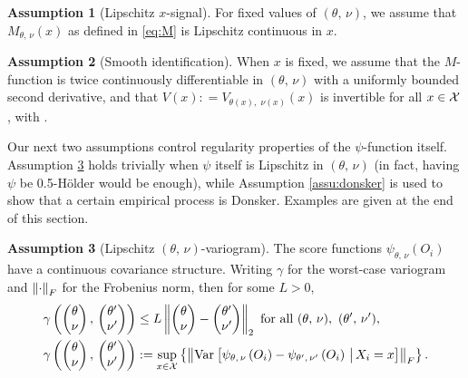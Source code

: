 \documentclass[aos]{imsart}
\theoremstyle{plain}
\theoremstyle{definition}
\newtheorem{assu}{Assumption}
\theoremstyle{remark}
\begin{document}
\begin{CJK}{UTF8}{gbsn}
{\begin{assu}[Lipschitz $x$-signal]
\label{assu:lip}
For fixed values of $(\theta, \, \nu)$, we assume that $M_{\theta, \, \nu}(x)$ 
as defined in \eqref{eq:M} is Lipschitz continuous in $x$.
\end{assu}

\begin{assu}[Smooth identification]
\label{assu:identification}
When $x$ is fixed, we assume that the $M$-function is twice continuously differentiable
in $(\theta, \, \nu)$ with a uniformly bounded second derivative, and
that $V(x): = V_{\theta(x), \, \, \nu(x)}(x)$ is invertible for all $x \in \mathcal{X}$, with
.
\end{assu}

Our next two assumptions control regularity properties of the $\psi$-function itself.
Assumption \ref{assu:covariance} holds trivially when $\psi$ itself is
Lipschitz in $(\theta, \, \nu)$ (in fact, having $\psi$ be 0.5-H{\"o}lder would be enough),
while Assumption \ref{assu:donsker} is used to show that a certain empirical process is
Donsker. Examples are given at the end of this section.

\begin{assu}[Lipschitz $(\theta, \, \nu)$-variogram]
\label{assu:covariance}
The score functions $\psi_{\theta, \, \nu}(O_i)$ 
have a continuous covariance structure.
Writing $\gamma$ for the worst-case variogram
and $\left\lVert\cdot\right\rVert_F$ for the Frobenius norm,
then for some $L > 0$,
\begin{equation}
\label{eq:variogram}
\begin{split}
&\gamma\p{ \begin{pmatrix} \theta \\ \nu \end{pmatrix}, \,  \begin{pmatrix} \theta' \\ \nu' \end{pmatrix}} \leq
L \Norm{\begin{pmatrix} \theta \\ \nu \end{pmatrix} -   \begin{pmatrix} \theta' \\ \nu' \end{pmatrix}}_2
\text{ for all } (\theta,\, \nu), \ (\theta',\,\nu'), \\
&\gamma\p{ \begin{pmatrix} \theta \\ \nu \end{pmatrix}, \,  \begin{pmatrix} \theta' \\ \nu' \end{pmatrix}}
:= \sup_{x \in \xx} \cb{\Norm{\Var{\psi_{\theta, \, \nu}\p{O_i} - \psi_{\theta', \, \nu'}\p{O_i} \cond X_i = x}}_F}.
\end{split}
\end{equation}
\end{assu}

}
\end{CJK}
\end{document}
